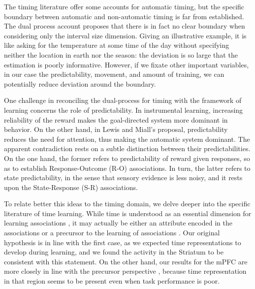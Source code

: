         The timing literature offer some accounts for automatic timing, but the specific boundary between automatic and non-automatic timing is far from established. The dual process account proposes that there is in fact no clear boundary when considering only the interval size dimension. Giving an illustrative example, it is like asking for the temperature at some time of the day without specifying neither the location in earth nor the season: the deviation is so large that the estimation is poorly informative. However, if we fixate other important variables, in our case the predictability, movement, and amount of training, we can potentially reduce deviation around the boundary.
        
        One challenge in reconciling the dual-process for timing with the framework of learning concerns the role of predictability. In instrumental learning, increasing reliability of the reward makes the goal-directed system more dominant in behavior. On the other hand, in Lewis and Miall's proposal, predictability reduces the need for attention, thus making the automatic system dominant. The apparent contradiction rests on a subtle distinction between their predictabilities. On the one hand, the former refers to predictability of reward given responses, so as to establish Response-Outcome (R-O) associations. In turn, the latter refers to state predictability, in the sense that sensory evidence is less noisy, and it rests upon the State-Response (S-R) associations.
        
        To relate better this ideas to the timing domain, we delve deeper into the specific literature of time learning. While time is understood as an essential dimension for learning associations \cite{balsam2009temporal,kirkpatrick2016associative}, it may actually be either an attribute encoded in the associations \cite{molet2014timing} or a precursor to the learning of associations \cite{balsam2002timing}. Our original hypothesis is in line with the first case, as we expected time representations to develop during learning, and we found the activity in the Striatum to be consistent with this statement. On the other hand, our results for the mPFC are more closely in line with the precursor perspective \cite{balsam2002timing}, because time representation in that region seems to be present even when task performance is poor. 
        
